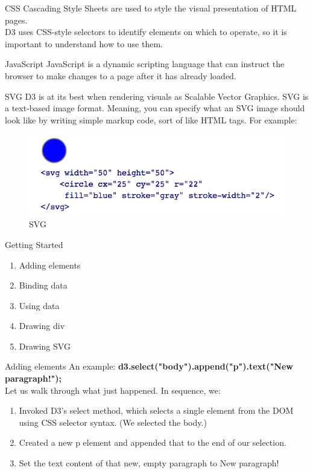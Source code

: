 \documentclass{beamer}
\begin{document}
\begin{frame}{CSS}
Cascading Style Sheets are used to style the visual presentation of HTML pages.
\newline \\
D3 uses CSS-style selectors to identify elements on which to operate, so it is important to understand how to use them.
\end{frame}

\begin{frame}{JavaScript}
JavaScript is a dynamic scripting language that can instruct the browser to make changes to a page after it has already loaded.
\end{frame}

\begin{frame}{SVG}
D3 is at its best when rendering visuals as Scalable Vector Graphics. SVG is a text-based image format. Meaning, you can specify what an SVG image should look like by writing simple markup code, sort of like HTML tags. For example:
\begin{figure}
\centering
\includegraphics[width=1.0\textwidth]{./images/SVG.png}
\caption{\label{fig:samplemax} SVG}
\end{figure}

\end{frame}


\begin{frame}{Getting Started}
\begin{enumerate}
	\item Adding elements
	\item Binding data
	\item Using data
	\item Drawing div
	\item Drawing SVG
\end{enumerate}
\end{frame}

\begin{frame}{Adding elements}
An example: \textbf{d3.select("body").append("p").text("New paragraph!");} \\
Let us walk through what just happened. In sequence, we:
\begin{enumerate}
	\item Invoked D3's select method, which selects a single element from the DOM using CSS selector syntax. (We selected the body.)
	\item Created a new p element and appended that to the end of our selection.
	\item Set the text content of that new, empty paragraph to New paragraph!
\end{enumerate} 
\end{frame}
\end{document}
